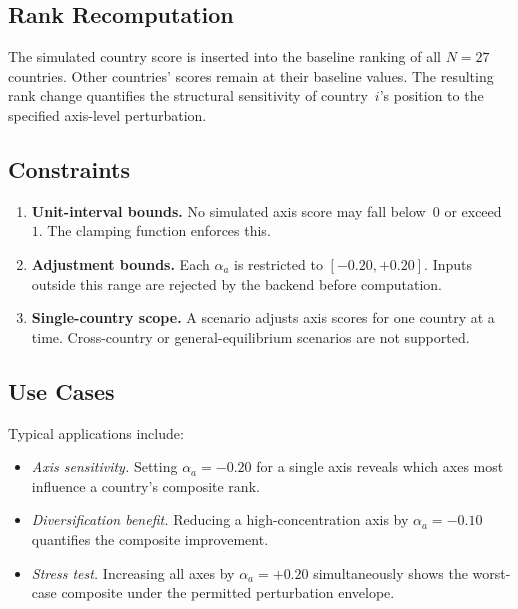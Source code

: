 \subsection{Rank Recomputation}\label{sec:scenario:rank}

The simulated country score is inserted into the baseline ranking of all
\(N = 27\) countries.  Other countries' scores remain at their baseline
values.  The resulting rank change quantifies the structural sensitivity
of country~\(i\)'s position to the specified axis-level perturbation.

\subsection{Constraints}\label{sec:scenario:constraints}

\begin{enumerate}
  \item \textbf{Unit-interval bounds.}  No simulated axis score may fall
    below~\(0\) or exceed~\(1\).  The clamping function enforces this.
  \item \textbf{Adjustment bounds.}  Each \(\alpha_a\) is restricted to
    \([-0.20, +0.20]\).  Inputs outside this range are rejected by the
    backend before computation.
  \item \textbf{Single-country scope.}  A scenario adjusts axis scores for
    one country at a time.  Cross-country or general-equilibrium scenarios
    are not supported.
\end{enumerate}

\subsection{Use Cases}\label{sec:scenario:uses}

Typical applications include:

\begin{itemize}
  \item \emph{Axis sensitivity.}  Setting \(\alpha_a = -0.20\) for a single
    axis reveals which axes most influence a country's composite rank.
  \item \emph{Diversification benefit.}  Reducing a high-concentration axis
    by \(\alpha_a = -0.10\) quantifies the composite improvement.
  \item \emph{Stress test.}  Increasing all axes by \(\alpha_a = +0.20\)
    simultaneously shows the worst-case composite under the permitted
    perturbation envelope.
\end{itemize}

